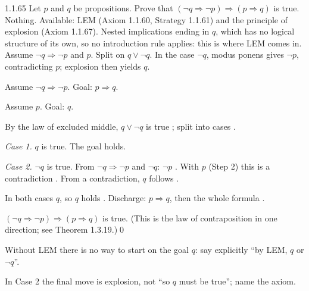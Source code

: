 \begin{bookex}[recommended]{1.1.65}
Let $p$ and $q$ be propositions. Prove that $(\neg q\Rightarrow\neg p)\Rightarrow(p\Rightarrow q)$ is true.
\solution
\given Nothing. Available: LEM (Axiom 1.1.60, Strategy 1.1.61) and the principle of explosion (Axiom 1.1.67).
\goal Nested implications ending in $q$, which has no logical structure of its own, so no introduction rule applies: this is where LEM comes in.
\plan Assume $\neg q\Rightarrow\neg p$ and $p$. Split on $q\vee\neg q$. In the case $\neg q$, modus ponens gives $\neg p$, contradicting $p$; explosion then yields $q$.
\begin{steps}
\item Assume $\neg q\Rightarrow\neg p$. Goal: $p\Rightarrow q$.
\item Assume $p$. Goal: $q$.
\item By the law of excluded middle, $q\vee\neg q$ is true ; split into cases .
\item \emph{Case 1.} $q$ is true. The goal holds.
\item \emph{Case 2.} $\neg q$ is true. From $\neg q\Rightarrow\neg p$ and $\neg q$: $\neg p$ . With $p$ (Step 2) this is a contradiction . From a contradiction, $q$ follows .
\item In both cases $q$, so $q$ holds . Discharge: $p\Rightarrow q$, then the whole formula .
\end{steps}
\conclusion $(\neg q\Rightarrow\neg p)\Rightarrow(p\Rightarrow q)$ is true. (This is the law of contraposition in one direction; see Theorem 1.3.19.)\qed
\begin{compare}
\item Without LEM there is no way to start on the goal $q$: say explicitly ``by LEM, $q$ or $\neg q$''.
\item In Case 2 the final move is explosion, not ``so $q$ must be true''; name the axiom.
\end{compare}
\end{bookex}

